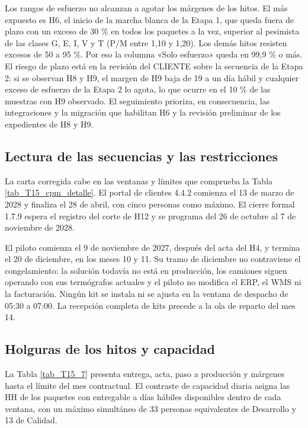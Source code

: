 
Los rangos de esfuerzo no alcanzan a agotar los márgenes de los hitos. El más expuesto es H6, el inicio de la marcha blanca de la Etapa 1, que queda fuera de plazo con un exceso de 30 \% en todos los paquetes a la vez, superior al pesimista de las clases G, E, I, V y T (P/M entre 1,10 y 1,20). Los demás hitos resisten excesos de 50 a 95 \%. Por eso la columna «Solo esfuerzo» queda en 99,9 \% o más. El riesgo de plazo está en la revisión del CLIENTE sobre la secuencia de la Etapa 2: si se observan H8 y H9, el margen de H9 baja de 19 a un día hábil y cualquier exceso de esfuerzo de la Etapa 2 lo agota, lo que ocurre en el 10 \% de las muestras con H9 observado. El seguimiento prioriza, en consecuencia, las integraciones y la migración que habilitan H6 y la revisión preliminar de los expedientes de H8 y H9.

\subsection{Lectura de las secuencias y las restricciones}

La carta corregida cabe en las ventanas y límites que comprueba la Tabla \ref{tab_T15_cpm_detalle}. El portal de clientes 4.4.2 comienza el 13 de marzo de 2028 y finaliza el 28 de abril, con cinco personas como máximo. El cierre formal 1.7.9 espera el registro del corte de H12 y se programa del 26 de octubre al 7 de noviembre de 2028.

El piloto comienza el 9 de noviembre de 2027, después del acta del H4, y termina el 20 de diciembre, en los meses 10 y 11. Su tramo de diciembre no contraviene el congelamiento: la solución todavía no está en producción, los camiones siguen operando con sus termógrafos actuales y el piloto no modifica el ERP, el WMS ni la facturación. Ningún kit se instala ni se ajusta en la ventana de despacho de 05:30 a 07:00. La recepción completa de kits precede a la ola de reparto del mes 14.

\subsection{Holguras de los hitos y capacidad}

La Tabla \ref{tab_T15_7} presenta entrega, acta, paso a producción y márgenes hasta el límite del mes contractual. El contraste de capacidad diaria asigna las HH de los paquetes con entregable a días hábiles disponibles dentro de cada ventana, con un máximo simultáneo de 33 personas equivalentes de Desarrollo y 13 de Calidad.

